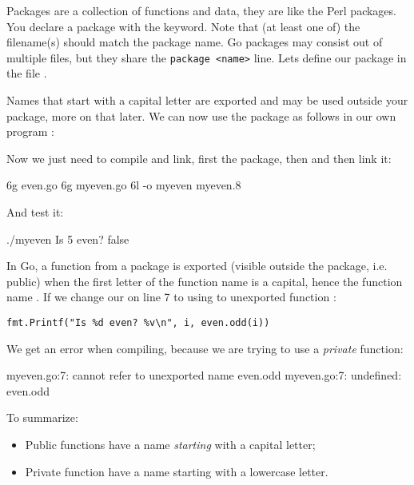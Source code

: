 \noindent{}Packages are a collection of functions and data, they are like the
Perl packages\cite{perl-packages}. You declare a package with the
 keyword. Note that (at least one of) the filename(s) should
match the package name. Go packages may consist out of multiple files,
but they share the \lstinline{package <name>} line.
Lets define our package  in the file .


Names that start with a capital letter are exported and may be used
outside your package, more on that later. We can now use
the package as follows in our own program :


Now we just need to compile and link, first the package, then  and
then link it:
\begin{display}
\pr 6g even.go			\qquad\qquad{}
\pr 6g myeven.go		\qquad\qquad{}
\pr 6l -o myeven myeven.8
\end{display}
And test it:
\begin{display}
\pr ./myeven
Is 5 even? false
\end{display}

In Go, a function from a package is exported (visible
outside the package, i.e. public) when the first letter of the function name is a capital, hence
the function name . If we change our  on line
7 to using to unexported function :

\noindent\lstinline{fmt.Printf("Is %d even? %v\n", i, even.odd(i))}

We get an error when compiling, because we are trying to use a
\emph{private} function:
\begin{display}
myeven.go:7: cannot refer to unexported name even.odd
myeven.go:7: undefined: even.odd
\end{display}
To summarize:
\begin{itemize}
\item Public functions have a name \emph{starting} with a capital
letter;
\item Private function have a name starting with a lowercase letter.
\end{itemize}

